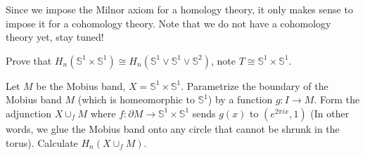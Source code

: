\documentclass[12pt,reqno]{amsart}
\numberwithin{theorem}{section}
\theoremstyle{definition}
\theoremstyle{remark}
\numberwithin{equation}{section}
\renewcommand{\S}{\mathbb S}
\newcommand{\del}{\partial}
\theoremstyle{definition}
\begin{document}
Since we impose the Milnor axiom for a homology theory, it only makes sense to impose it for a cohomology theory. Note that we do not have a cohomology theory yet, stay tuned!
\begin{exercise}
     Prove that $H_n(\S^1\times \S^1) \cong H_n(\S^1 \vee \S^1 \vee \S^2)$, note $T\cong \S^1 \times \S^1$.
\end{exercise}
\begin{exercise}
    Let $M$ be the Mobius band, $X = \S^1\times \S^1$. Parametrize the boundary of the Mobius band $M$ (which is homeomorphic to $\S^1$) by a function $g:I \rightarrow M$. Form the adjunction $X\cup_f M$ where $f:\del M \rightarrow \S^1\times \S^1$ sends $g(x)$ to $(e^{2\pi i x},1)$ (In other words, we glue the Mobius band onto any circle that cannot be shrunk in the torus). Calculate $H_n(X\cup_f M)$.
\end{exercise}

\printbibliography
\end{document}
